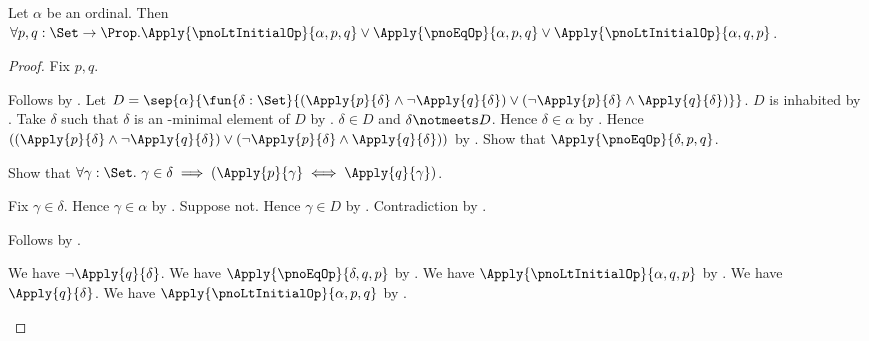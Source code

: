 \begin{theorem}\label{pno_lt_initial_trichotomy}
    Let $\alpha$ be an ordinal.
    Then $\forall p,q:\Set\to\Prop.
        \Apply{\pnoLtInitialOp}{\alpha,p,q}\lor
        \Apply{\pnoEqOp}{\alpha,p,q}\lor
        \Apply{\pnoLtInitialOp}{\alpha,q,p}$.
\end{theorem}
\begin{proof}
    Fix $p,q$.
    \begin{byCase}
            Follows by .
            Let $D=\sep{\alpha}{\fun{\delta:\Set}{
                (\Apply{p}{\delta}\land\lnot\Apply{q}{\delta})\lor
                (\lnot\Apply{p}{\delta}\land\Apply{q}{\delta})}}$.
            $D$ is inhabited
                by .
            Take $\delta$ such that $\delta$ is an \in-minimal element of $D$
                by .
            $\delta\in D$ and $\delta\notmeets D$.
            Hence $\delta\in\alpha$
                by .
            Hence
                $((\Apply{p}{\delta}\land\lnot\Apply{q}{\delta})\lor
                 (\lnot\Apply{p}{\delta}\land\Apply{q}{\delta}))$
                by .
            Show that
                $\Apply{\pnoEqOp}{\delta,p,q}$.
            \begin{subproof}
                Show that $\forall \gamma:\Set.\ \gamma\in\delta\implies
                    (\Apply{p}{\gamma}\iff\Apply{q}{\gamma})$.
                \begin{subproof}
                    Fix $\gamma\in\delta$.
                    Hence $\gamma\in\alpha$
                        by .
                    Suppose not.
                    Hence $\gamma\in D$
                        by .
                    Contradiction by .
                \end{subproof}
                Follows by .
            \end{subproof}
            \begin{byCase}
                    We have $\lnot\Apply{q}{\delta}$.
                    We have
                        $\Apply{\pnoEqOp}{\delta,q,p}$
                        by .
                    We have
                        $\Apply{\pnoLtInitialOp}{\alpha,q,p}$
                        by .
                    We have $\Apply{q}{\delta}$.
                    We have
                        $\Apply{\pnoLtInitialOp}{\alpha,p,q}$
                        by .
            \end{byCase}
    \end{byCase}
\end{proof}
